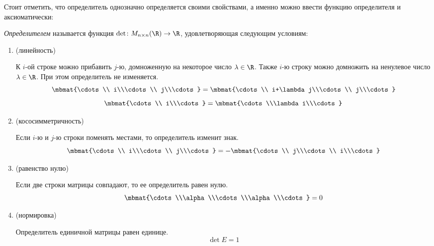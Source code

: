Стоит отметить, что определитель однозначно определяется своими свойствами, а именно можно ввести функцию определителя и аксиоматически:

\emph{Определителем} называется функция $\det\colon M_{n\times n}(\R)\to\R$, удовлетворяющая следующим условиям:

\begin{enumerate}
	\item(линейность)\par
		К $i$-ой строке можно прибавить $j$-ю, домноженную на некоторое число
		$\lambda\in\R$. Также $i$-ю строку можно домножить на ненулевое число
		$\lambda\in\R$. При этом определитель не изменяется.
		$$
			\mbmat{\cdots\\ i\\\cdots\\ j\\\cdots}=
			\mbmat{\cdots\\ i+\lambda j\\\cdots\\ j\\\cdots}
		$$ $$
			\mbmat{\cdots\\ i\\\cdots}=
			\mbmat{\cdots\\\lambda i\\\cdots}
		$$
	\item(кососимметричность)\par
		Если $i$-ю и $j$-ю строки поменять местами, то определитель изменит знак.
		$$
			\mbmat{\cdots\\ i\\\cdots\\ j\\\cdots}=-
			\mbmat{\cdots\\ j\\\cdots\\ i\\\cdots}
		$$
	\item(равенство нулю)\par
		Если две строки матрицы совпадают, то ее определитель равен нулю.
		$$
			\mbmat{\cdots\\\alpha\\\cdots\\\alpha\\\cdots}=0
		$$
	\item(нормировка)\par
		Определитель единичной матрицы равен единице.
		$$ \det E=1 $$
\end{enumerate}

